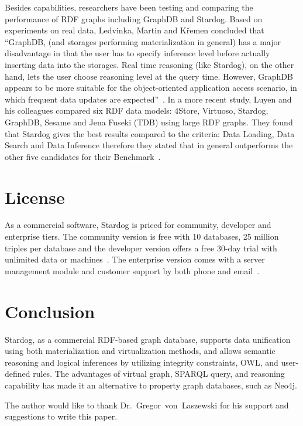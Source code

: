 		Besides capabilities, researchers have been testing and comparing the 
		performance of RDF graphs including GraphDB and Stardog. Based on 
		experiments on real data, Ledvinka, Martin and K{\v{r}}emen concluded 
		that ``GraphDB, (and storages performing materialization in general) 
		has a major disadvantage in that the user has to specify inference level 
		before actually inserting data into the storages. Real time reasoning (like 
		Stardog), on the other hand, lets the user choose reasoning level at the 
		query time. However, GraphDB appears to be more suitable for the 
		object-oriented application access scenario, in which frequent data 
		updates are 
		expected''~\cite{hid-sp18-405-ledvinka2015object-stardog}. In a more 
		recent study, Luyen and his colleagues compared six RDF data models: 
		4Store, Virtuoso, Stardog, GraphDB, Sesame and Jena Fuseki (TDB) 
		using large RDF graphs. They found that Stardog gives the best results 
		compared to the criteria: Data Loading, Data Search and Data Inference 
		therefore they stated that in general outperforms the other five 
		candidates for their 
		Benchmark~\cite{hid-sp18-405-luyen2016development-stardog}.


\section{License}
\label{s:license}
	As a commercial software, Stardog is priced for community, developer and 
	enterprise tiers. The community version is free with 10 databases, 25 
	million triples per database and the developer version offers a free 30-day 
	trial with unlimited data or 
	machines~\cite{hid-sp18-405-www-stardog-predictiveanalyticstoday}. The 
	enterprise version comes with a server management module and customer 
	support by both phone and email~\cite{hid-sp18-405-www-stardog-docs}.


\section{Conclusion}
\label{s:conclusion}
	Stardog, as a commercial RDF-based graph database, supports data 
	unification using both materialization and virtualization methods, and 
	allows semantic reasoning and logical inferences by utilizing integrity 
	constraints, OWL, and user-defined rules. The advantages of virtual 
	graph, SPARQL query, and reasoning capability has made it an alternative 
	to property graph databases, such as Neo4j. 


\begin{acks}

  The author would like to thank Dr.~Gregor~von~Laszewski for his
  support and suggestions to write this paper.

\end{acks}


 

